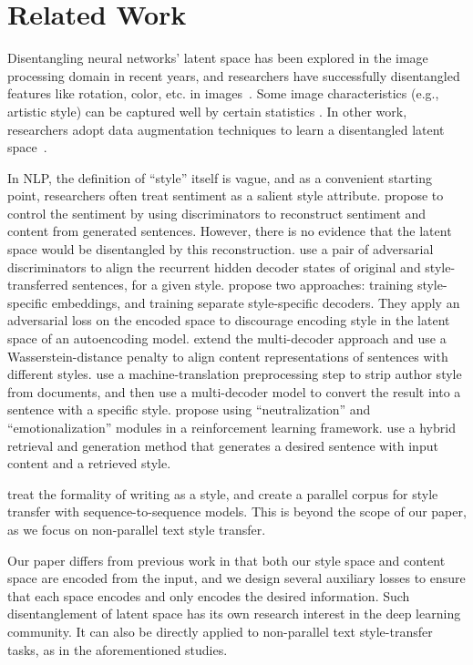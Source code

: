 \documentclass[11pt,a4paper]{article}
\begin{document}
\section{Related Work}

Disentangling neural networks' latent space has been explored in the image processing domain in recent years, and researchers have successfully disentangled features like rotation, color, etc. in images~\cite{chen2016infogan,luan2017deep}.
Some image characteristics (e.g., artistic style) can be captured well by certain statistics \cite{gatys2016image}.
In other work, researchers adopt data augmentation techniques to learn a disentangled latent space~\cite{kulkarni2015deep,champandard2016semantic}.

In NLP, the definition of ``style'' itself is vague, and as a convenient starting point, researchers often treat sentiment as a salient style attribute.
\citet{hu2017toward} propose to control the sentiment by using discriminators to reconstruct sentiment and content from generated sentences.
However, there is no evidence that the latent space would be disentangled by this reconstruction.
\citet{shen2017style} use a pair of adversarial discriminators to align the recurrent hidden decoder states of original and style-transferred sentences, for a given style.
\citet{fu2018style} propose two approaches: training style-specific embeddings, and training separate style-specific decoders. They apply an adversarial loss on the encoded space to discourage encoding style in the latent space of an autoencoding model.
\citet{zhao2018adversarially} extend the multi-decoder approach and use a Wasserstein-distance penalty to align content representations of sentences with different styles.
\citet{prabhumoye2018style} use a machine-translation preprocessing step to strip author style from documents, and then use a multi-decoder model to convert the result into a sentence with a specific style.
\citet{xu2018unpaired} propose using ``neutralization'' and ``emotionalization'' modules in a reinforcement learning framework.
\citet{li2018delete} use a hybrid retrieval and generation method that generates a desired sentence with input content and a retrieved style.

\citet{rao2018dear} treat the formality of writing as a style, and create a parallel corpus for style transfer with sequence-to-sequence models.
This is beyond the scope of our paper, as we focus on non-parallel text style transfer.

Our paper differs from previous work in that both our style space and content space are encoded from the input, and we design several auxiliary losses to ensure that each space encodes and only encodes the desired information.
Such disentanglement of latent space has its own research interest in the deep learning community.
It can also be directly applied to non-parallel text style-transfer tasks, as in the aforementioned studies.
\end{document}
